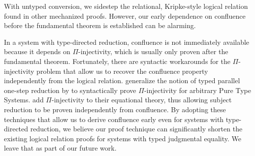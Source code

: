 \documentclass[\ifpublic nolinenum\else\fi,online,OA]{jfp}
\newcommand{\scw}[1]{}
\newcommand{\yl}[1]{}
\newcommand{\jc}[1]{}
\theoremstyle{definition}
\begin{document}
With untyped conversion,
we sidestep the relational, Kripke-style logical relation found in
other mechanized proofs. \scw{Need to define Kripke-style. Also the other
proofs need Kripke style because they are defining typed relations, not untyped
relations. } \yl{I wonder if
we can just assume some more technical knowledge from the readers in
this section.}
However, our early dependence on confluence
before the fundamental theorem is established can be alarming.
\jc{The rest of this paragraph is about confluence and Pi-injectivity,
not untyped conversion Kripke-style, so maybe the first sentence of the
paragraph shouldn't start with talking about them?}
In a system with type-directed reduction,
confluence is not immediately available because it
depends on $\Pi$-injectivity, which is usually only proven after the
fundamental theorem.\scw{confluence depends on Pi injectivity? I thought
it was only needed for subject reduction}\yl{it's
transitive. Confluence depends on subject reduction, which in turn
depends on pi injectivity. Maybe it's worth spelling out the details}
Fortunately, there are syntactic workarounds for the $\Pi$-injectivity
problem that allow us to recover the confluence property independently
from the logical relation. \citet{siles2012pure} generalize the
notion of typed parallel one-step reduction by \citet{adams2006pure}
to syntactically prove $\Pi$-injectivity for arbitrary Pure Type
Systems. \citet{weirich:systemd} add $\Pi$-injectivity to their
equational theory, thus allowing subject reduction to be proven
independently from confluence. By adopting these techniques that allow
us to derive confluence early even for systems with type-directed
reduction, we believe our proof technique can significantly shorten
the existing logical relation proofs for systems with typed
judgmental equality. We leave that as part of our future work.
\end{document}
